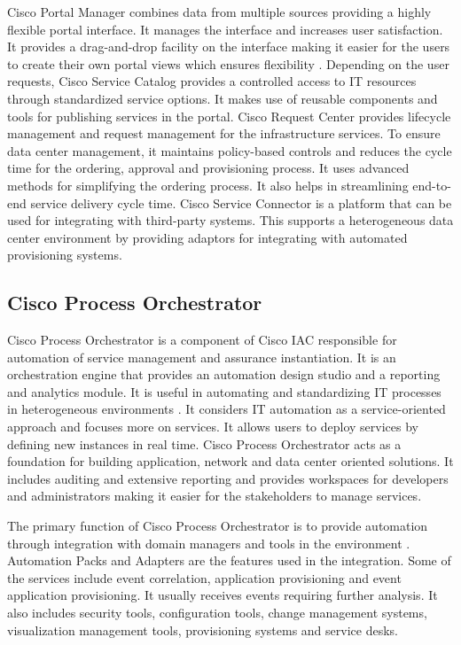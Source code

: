 \documentclass[9pt,twocolumn,twoside]{../../styles/osajnl}
\begin{document}
Cisco Portal Manager combines data from multiple sources providing a
highly flexible portal interface. It manages the interface and
increases user satisfaction. It provides a drag-and-drop facility on
the interface making it easier for the users to create their own
portal views which ensures flexibility
\cite{cloudportal-datasheet}. Depending on the user requests, Cisco
Service Catalog provides a controlled access to IT resources through
standardized service options. It makes use of reusable components and
tools for publishing services in the portal. Cisco Request Center
provides lifecycle management and request management for the
infrastructure services. To ensure data center management, it
maintains policy-based controls and reduces the cycle time for the
ordering, approval and provisioning process. It uses advanced methods
for simplifying the ordering process. It also helps in streamlining
end-to-end service delivery cycle time. Cisco Service Connector is a
platform that can be used for integrating with third-party
systems. This supports a heterogeneous data center environment by
providing adaptors for integrating with automated provisioning
systems.

\subsection{Cisco Process Orchestrator}

Cisco Process Orchestrator is a component of Cisco IAC responsible for
automation of service management and assurance instantiation. It is an
orchestration engine that provides an automation design studio and a
reporting and analytics module. It is useful in automating and
standardizing IT processes in heterogeneous environments
\cite{cisco-orchestrator}. It considers IT automation as a
service-oriented approach and focuses more on services. It allows
users to deploy services by defining new instances in real time. Cisco
Process Orchestrator acts as a foundation for building application,
network and data center oriented solutions. It includes auditing and
extensive reporting and provides workspaces for developers and
administrators making it easier for the stakeholders to manage
services.

The primary function of Cisco Process Orchestrator is to provide
automation through integration with domain managers and tools in the
environment \cite{orchestrator-datasheet}. Automation Packs and
Adapters are the features used in the integration. Some of the
services include event correlation, application provisioning and event
application provisioning. It usually receives events requiring further
analysis. It also includes security tools, configuration tools, change
management systems, visualization management tools, provisioning
systems and service desks.
\end{document}
